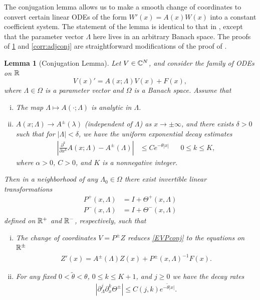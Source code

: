 \documentclass[12pt]{elsarticle}
\theoremstyle{plain}
\newtheorem{lemma}[theorem]{Lemma}
\theoremstyle{definition}
\theoremstyle{remark}
\numberwithin{theorem}{section}
\numberwithin{equation}{section}
\begin{document}
The conjugation lemma allows us to make a smooth change of coordinates to convert certain linear ODEs of the form $W'(x) = A(x) W(x)$ into a constant coefficient system. The statement of the lemma is identical to that in \cite{Zumbrun2009}, except that the parameter vector $\Lambda$ here lives in an arbitrary Banach space. The proofs of \cref{conjlemma} and \cref{corr:adjconj} are straightforward modifications of the proof of \cite[Corollary 2.3]{Zumbrun2009}.

\begin{lemma}[Conjugation Lemma]\label{conjlemma}
Let $V \in \mathbb{C}^N$, and consider the family of ODEs on $\mathbb{R}$
\begin{equation}\label{EVPconj}
V(x)' = A(x; \Lambda) V(x) + F(x),
\end{equation}
where $\Lambda \in \Omega$ is a parameter vector and $\Omega$ is a Banach space. Assume that
\begin{enumerate}[(i)]
	\item The map $\Lambda \mapsto A(\cdot; \Lambda)$ is analytic in $\Lambda$.
	\item $A(x; \Lambda) \rightarrow A^\pm(\lambda)$ (independent of $\Lambda$) as $x \rightarrow \pm \infty$, and there exists $\delta > 0$ such that for $|\Lambda| < \delta$, we have the uniform exponential decay estimates 
	\begin{align}
	\left| \frac{\partial^k}{\partial x^k} A(x; \Lambda) - A^\pm(\Lambda) \right| 
	&\leq C e^{-\theta |x|} && 0 \leq k \leq K,
	\end{align}
	where $\alpha > 0$, $C > 0$, and $K$ is a nonnegative integer.
\end{enumerate}
Then in a neighborhood of any $\Lambda_0 \in \Omega$ there exist invertible linear transformations
\begin{equation}\label{conjlemmaP}
\begin{aligned}
P^+(x, \Lambda) &= I + \Theta^+(x, \Lambda) \\
P^-(x, \Lambda) &= I + \Theta^-(x, \Lambda) 
\end{aligned}
\end{equation}
defined on $\mathbb{R}^+$ and $\mathbb{R}^-$, respectively, such that
\begin{enumerate}[(i)]
\item The change of coordinates $V = P^\pm Z$ reduces \cref{EVPconj} to the equations on $\mathbb{R}^\pm$
\begin{align}\label{conjZ}
Z'(x) = A^\pm(\Lambda) Z(x) + P^\pm(x, \Lambda)^{-1} F(x).
\end{align}

\item For any fixed $0 < \tilde{\theta} < \theta$, $0 \leq k \leq K+1$, and $j \geq 0$ we have the decay rates
\begin{align}\label{conjthetadecay}
\left| \partial_\Lambda^j \partial_x^k \Theta^\pm \right| \leq C(j, k)e^{-\tilde{\theta}|x|}.
\end{align}
\end{enumerate}
\end{lemma}
\end{document}
